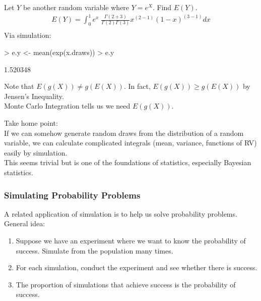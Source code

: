 \documentclass[handout]{beamer}
\begin{document}
\begin{frame}[fragile]
Let $Y$ be another random variable where $Y = e^X$.  Find $E(Y)$.
\pause
\begin{eqnarray*}
E(Y) = \int^{1}_{0} e^x \; \frac{\Gamma (2 + 3)}{\Gamma (2)
\Gamma (3)} x^{(2 - 1)} (1 - x)^{(3-1)} dx \\
\end{eqnarray*}
\pause
Via simulation:
\medskip
\tiny
\pause
\begin{Schunk}
\begin{Sinput}
> e.y <- mean(exp(x.draws))
> e.y
\end{Sinput}
\begin{Soutput}
[1] 1.520348
\end{Soutput}
\end{Schunk}
\normalsize
\pause
\bigskip
Note that $E(g(X)) \neq g(E(X))$.  \pause In fact, $E(g(X)) \ge
g(E(X))$ by Jensen's Inequality.\\
\pause
\bigskip
Monte Carlo Integration tells us we need $E(g(X))$.
\end{frame}

\begin{frame}
Take home point: \\
\bigskip
\pause
If we can somehow generate random draws from the distribution of a
random variable, we can calculate complicated integrals (mean,
variance, functions of RV) easily by simulation. \\
\bigskip
\pause
This seems trivial but is one of the foundations of statistics,
especially Bayesian statistics.
\end{frame}

\begin{frame}
\frametitle{Simulating Probability Problems}
\pause
A related application of simulation is to help us solve probability problems.\\
\pause
\bigskip
General idea:
\pause
\begin{enumerate}
\item Suppose we have an experiment where we want to know the probability of
success.  Simulate from the population many times.
\pause
\item For each simulation, conduct the experiment and see whether there is success.
\pause
\item The proportion of simulations that achieve success is the
probability of success.
\end{enumerate}
\end{frame}
\end{document}
